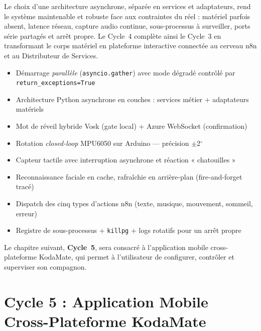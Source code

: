 \documentclass[a4paper,12pt]{report}
\begin{document}
	Le choix d'une architecture asynchrone, séparée en services et
	adaptateurs, rend le système maintenable et robuste face aux contraintes
	du réel : matériel parfois absent, latence réseau, capture audio continue,
	sous-processus à surveiller, ports série partagés et arrêt propre. Le
	Cycle~4 complète ainsi le Cycle~3 en transformant le corps matériel en
	plateforme interactive connectée au cerveau n8n et au Distributeur de
	Services.
	
	\begin{tcolorbox}[colback=blue!5!white, colframe=blue!60!black,
		title=\textbf{Points clés du Cycle 4}]
		\begin{itemize}[noitemsep]
			\item Démarrage \emph{parallèle} (\texttt{asyncio.gather}) avec mode dégradé contrôlé par \texttt{return\_exceptions=True}
			\item Architecture Python asynchrone en couches : services métier + adaptateurs matériels
			\item Mot de réveil hybride Vosk (gate local) + Azure WebSocket (confirmation)
			\item Rotation \emph{closed-loop} MPU6050 sur Arduino — précision $\pm$2$^\circ$
			\item Capteur tactile avec interruption asynchrone et réaction « chatouilles »
			\item Reconnaissance faciale en cache, rafraîchie en arrière-plan (fire-and-forget tracé)
			\item Dispatch des cinq types d'actions n8n (texte, musique, mouvement, sommeil, erreur)
			\item Registre de sous-processus + \texttt{killpg} + logs rotatifs pour un arrêt propre
		\end{itemize}
	\end{tcolorbox}
	
	Le chapitre suivant, \textbf{Cycle~5}, sera consacré à l'application
	mobile cross-plateforme KodaMate, qui permet à l'utilisateur de
	configurer, contrôler et superviser son compagnon.

	\chapter{Cycle 5 : Application Mobile Cross-Plateforme KodaMate}
	
\end{document}
